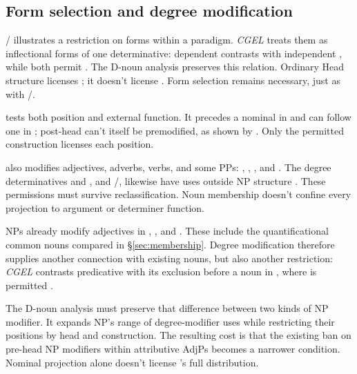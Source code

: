 \documentclass[12pt]{article}
\begin{document}
\subsection{Form selection and degree modification}\label{sec:enough}

/ illustrates a restriction on forms within a paradigm. \textit{CGEL} treats them as inflectional forms of one determinative: dependent  contrasts with independent , while both permit  \citep[389--390]{huddleston2002}. The D-noun analysis preserves this relation. Ordinary Head structure licenses ; it doesn't license . Form selection remains necessary, just as with /.

 tests both position and external function. It precedes a nominal in  and can follow one in ; post-head  can't itself be premodified, as shown by  \citep[396--397, 445]{huddleston2002}. Only the permitted construction licenses each position.

 also modifies adjectives, adverbs, verbs, and some PPs: , , , and  \citep[396--397]{huddleston2002}. The degree determinatives  and , and /, likewise have uses outside NP structure \citep[390, 395--397]{huddleston2002}. These permissions must survive reclassification. Noun membership doesn't confine every projection to argument or determiner function.

NPs already modify adjectives in , , and  \citep[549--550]{huddleston2002}. These include the quantificational common nouns compared in §\ref{sec:membership}. Degree modification therefore supplies another connection with existing nouns, but also another restriction: \textit{CGEL} contrasts predicative  with its exclusion before a noun in , where  is permitted \citep[551--552]{huddleston2002}.

The D-noun analysis must preserve that difference between two kinds of NP modifier. It expands NP's range of degree-modifier uses while restricting their positions by head and construction. The resulting cost is that the existing ban on pre-head NP modifiers within attributive AdjPs becomes a narrower condition. Nominal projection alone doesn't license 's full distribution.
\end{document}
